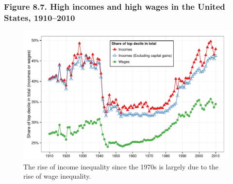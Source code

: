 \documentclass[t]{beamer}\usepackage[]{graphicx}\usepackage[]{color}
\newenvironment{knitrout}{}{} %
\begin{document}
\begin{frame}[label=Figure_8_7,fragile]
\frametitle{Figure 8.7. High incomes and high wages in the United States, 1910--2010}
\begin{figure}[t]
\begin{minipage}[b]{\textwidth}
\centering %
\begin{knitrout}\footnotesize
{}\color{fgcolor}

{\centering \includegraphics[width=1\linewidth]{figures/color/Figure_8_7} 

}



\end{knitrout}
\caption{The rise of income inequality since the 1970s is largely due to the rise of wage inequality.}
\end{minipage}
\end{figure}
\end{frame}
\end{document}
